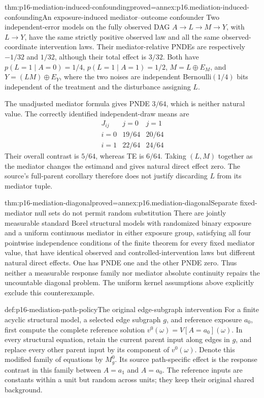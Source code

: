 \begin{hbtheorem}{thm:p16-mediation-induced-confounding}{proved=annex:p16.mediation-induced-confounding}{An exposure-induced mediator--outcome confounder}
Two independent-error models on the fully observed DAG
\(A\to L\to M\to Y\), with \(L\to Y\), have the same strictly
positive observed law and all the same observed-coordinate intervention
laws. Their mediator-relative PNDEs are respectively \(-1/32\) and
\(1/32\), although their total effect is \(3/32\).
Both have \(p(L=1\mid A=0)=1/4\), \(p(L=1\mid A=1)=1/2\),
\(M=L\oplus E_M\), and \(Y=(LM)\oplus E_Y\), where the two noises
are independent Bernoulli\((1/4)\) bits independent of the treatment
and the disturbance assigning \(L\).

The unadjusted mediator formula gives PNDE \(3/64\), which is neither
natural value. The correctly identified independent-draw means are
\[
 \begin{array}{c|cc}
 J_{ij}&j=0&j=1\\\hline
 i=0&19/64&20/64\\i=1&22/64&24/64
 \end{array}
\]
Their overall contrast is \(5/64\), whereas TE is \(6/64\).
Taking \((L,M)\) together as the mediator changes the estimand and gives
natural direct effect zero. The source's full-parent corollary therefore
does not justify discarding \(L\) from its mediator tuple.
\end{hbtheorem}

\begin{hbtheorem}{thm:p16-mediation-diagonal}{proved=annex:p16.mediation-diagonal}{Separate fixed-mediator null sets do not permit random substitution}
There are jointly measurable standard Borel structural models with
randomized binary exposure and a uniform continuous mediator in either
exposure group, satisfying all four pointwise independence conditions of
the finite theorem for every fixed mediator value, that have identical
observed and controlled-intervention laws but different natural direct
effects. One has PNDE one and the other PNDE zero. Thus neither a
measurable response family nor mediator absolute continuity repairs the
uncountable diagonal problem. The uniform kernel assumptions above
explicitly exclude this counterexample.
\end{hbtheorem}

\begin{hbdefinition}{def:p16-mediation-path-policy}{The original edge-subgraph intervention}
For a finite acyclic structural model, a selected edge subgraph \(g\),
and reference exposure \(a_0\), first compute the complete reference
solution \(v^0(\omega)=V[A=a_0](\omega)\). In every structural equation,
retain the current parent input along edges in \(g\), and replace every
other parent input by its component of \(v^0(\omega)\). Denote this
modified family of equations by \(M_g^0\). Its source path-specific
effect is the response contrast in this family between \(A=a_1\)
and \(A=a_0\). The reference inputs are constants within a unit but
random across units; they keep their original shared background.
\end{hbdefinition}

